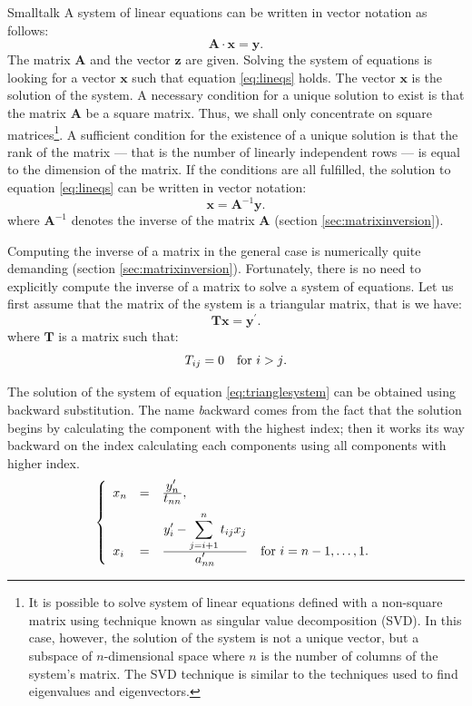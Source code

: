 \begin{displaycode}{Smalltalk}
A system of linear equations can be written in
vector notation as follows:
\begin{equation}
\label{eq:lineqs}
  \textbf{A}\cdot\textbf{x}=\textbf{y}.
\end{equation}
The matrix $\textbf{A}$ and the vector $\textbf{z}$ are given. Solving
the system of equations is looking for a vector $\textbf{x}$ such
that equation \ref{eq:lineqs} holds. The vector $\textbf{x}$ is the
solution of the system. A necessary condition for a unique
solution to exist is that the matrix $\textbf{A}$ be a square matrix.
Thus, we shall only concentrate on square matrices\footnote{It is
possible to solve system of linear equations defined with a
non-square matrix using technique known as singular value
decomposition (SVD). In this case, however, the solution of the
system is not a unique vector, but a subspace of $n$-dimensional
space where $n$ is the number of columns of the system's matrix.
The SVD technique is similar to the techniques used to find
eigenvalues and eigenvectors.}. A sufficient condition for the
existence of a unique solution is that the rank of the matrix
--- that is the number of linearly independent rows
--- is equal to the dimension of the matrix.
If the conditions are all fulfilled, the solution to equation
\ref{eq:lineqs} can be written in vector notation:
\begin{equation}
  \textbf{x}=\textbf{A}^{-1}\textbf{y}.
\end{equation}
where $\textbf{A}^{-1}$ denotes the inverse of the matrix $\textbf{A}$
(\cf section \ref{sec:matrixinversion}).

Computing the inverse of a matrix in the general case is
numerically quite demanding (\cf section
\ref{sec:matrixinversion}). Fortunately, there is no need to
explicitly compute the inverse of a matrix to solve a system of
equations. Let us first assume that the matrix of the system is a
triangular matrix, that is we have:
\begin{equation}
\label{eq:trianglesystem}
  \textbf{T}\textbf{x}=\textbf{y}^{\prime}.
\end{equation}
where $\textbf{T}$ is a matrix such that:
\begin{equation}
  T_{ij}=0 \mbox{\quad for $i>j$}.
\end{equation}

 The solution of the system of
equation \ref{eq:trianglesystem} can be obtained using backward
substitution. The name {\textsl backward} comes from the fact that the
solution begins by calculating the component with the highest
index; then it works its way backward on the index calculating
each components using all components with higher index.
\begin{equation}
  \left\{
  \begin{array}{lcl}
    x_n & = & {\displaystyle y_n^{\prime} \over\displaystyle t_{nn}},
    \\*[2 ex]
    x_i & = & {\displaystyle y_i^{\prime} - \sum_{j=i+1}^n t_{ij}x_j
     \over\displaystyle a_{nn}^{\prime}} \mbox{\quad for
     $i=n-1,\ldots,1$}.
  \end{array}
  \right.
\end{equation}


\end{displaycode}
